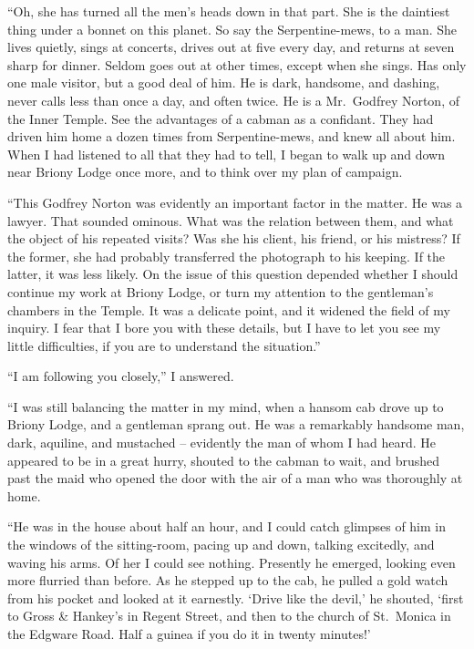 “Oh, she has turned all the men’s heads down in that part.
She is the daintiest thing under a bonnet on this planet. So
say the Serpentine-mews, to a man. She lives quietly, sings
at concerts, drives out at five every day, and returns at seven
sharp for dinner. Seldom goes out at other times, except
when she sings. Has only one male visitor, but a good deal
of him. He is dark, handsome, and dashing, never calls less
than once a day, and often twice. He is a Mr.~Godfrey Norton,
of the Inner Temple. See the advantages of a cabman
as a confidant. They had driven him home a dozen times
from Serpentine-mews, and knew all about him. When I had
listened to all that they had to tell, I began to walk up and
down near Briony Lodge once more, and to think over my
plan of campaign.

“This Godfrey Norton was evidently an important factor in
the matter. He was a lawyer. That sounded ominous. What
was the relation between them, and what the object of his
repeated visits? Was she his client, his friend, or his mistress?
If the former, she had probably transferred the photograph to
his keeping. If the latter, it was less likely. On the issue of
this question depended whether I should continue my work
at Briony Lodge, or turn my attention to the gentleman’s
chambers in the Temple. It was a delicate point, and it
widened the field of my inquiry. I fear that I bore you with
these details, but I have to let you see my little difficulties, if
you are to understand the situation.”

“I am following you closely,” I answered.

“I was still balancing the matter in my mind, when a hansom
cab drove up to Briony Lodge, and a gentleman sprang
out. He was a remarkably handsome man, dark, aquiline, and
mustached -- evidently the man of whom I had heard. He
appeared to be in a great hurry, shouted to the cabman to wait,
and brushed past the maid who opened the door with the air
of a man who was thoroughly at home.

“He was in the house about half an hour, and I could catch
glimpses of him in the windows of the sitting-room, pacing
up and down, talking excitedly, and waving his arms. Of
her I could see nothing. Presently he emerged, looking even
more flurried than before. As he stepped up to the cab, he
pulled a gold watch from his pocket and looked at it earnestly.
‘Drive like the devil,’ he shouted, ‘first to Gross \& Hankey’s
in Regent Street, and then to the church of St.~Monica in the
Edgware Road. Half a guinea if you do it in twenty
minutes!’

